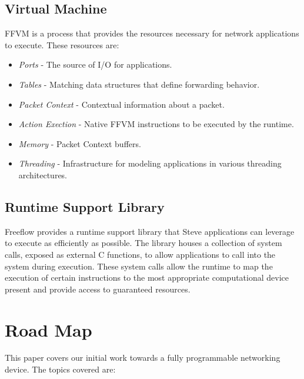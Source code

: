 \subsection{Virtual Machine}
FFVM is a process that provides the resources necessary for network
applications to execute. These resources are:

\begin{itemize}
\item \emph{Ports} - The source of I/O for applications.
\item \emph{Tables} - Matching data structures that define forwarding behavior.
\item \emph{Packet Context} - Contextual information about a packet.
\item \emph{Action Exection} - Native FFVM instructions to be executed by the
runtime.
\item \emph{Memory} - Packet Context buffers.
\item \emph{Threading} - Infrastructure for modeling applications in various
threading architectures.
\end{itemize}

\subsection{Runtime Support Library}
Freeflow provides a runtime support library that Steve applications can
leverage to execute as efficiently as possible. The library houses a collection
of system calls, exposed as external C functions, to allow applications to call
into the system during execution. These system calls allow the runtime to map the execution of certain instructions to the most appropriate computational device present and provide access to guaranteed resources.

\section{Road Map}
This paper covers our initial work towards a fully programmable networking device. The topics covered are:
